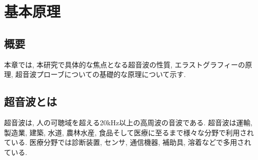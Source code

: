 \chapter{基本原理}
\newpage
\section{概要}
本章では, 本研究で具体的な焦点となる超音波の性質, エラストグラフィーの原理, 超音波プローブについての基礎的な原理について示す.

\section{超音波とは}
超音波は, 人の可聴域を超える20kHz以上の高周波の音波である. 超音波は運輸, 製造業, 建築, 水道, 農林水産, 食品そして医療に至るまで様々な分野で利用されている. 医療分野では診断装置, センサ, 通信機器, 補助具, 溶着などで多用されている. 

